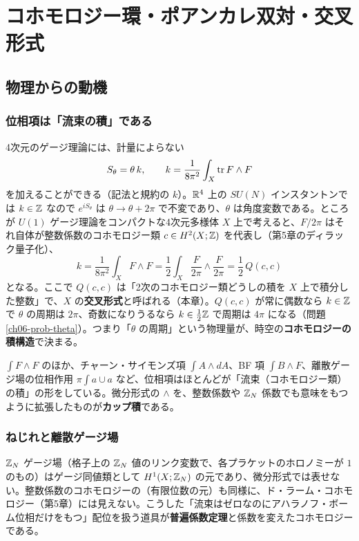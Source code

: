 \chapter{コホモロジー環・ポアンカレ双対・交叉形式}\label{ch:06}

\section{物理からの動機}

\subsection*{位相項は「流束の積」である}
4次元のゲージ理論には、計量によらない
\[
S_\theta=\theta\,k,\qquad k=\frac{1}{8\pi^2}\int_X\tr F\wedge F
\]
を加えることができる（記法と規約の $k$）。$\mathbb{R}^4$ 上の $SU(N)$ インスタントンでは $k\in\mathbb{Z}$ なので $e^{iS_\theta}$ は $\theta\to\theta+2\pi$ で不変であり、$\theta$ は角度変数である。ところが $U(1)$ ゲージ理論をコンパクトな4次元多様体 $X$ 上で考えると、$F/2\pi$ はそれ自体が整数係数のコホモロジー類 $c\in H^2(X;\mathbb{Z})$ を代表し（第5章のディラック量子化）、
\[
k=\frac{1}{8\pi^2}\int_X F\wedge F=\frac12\int_X\frac{F}{2\pi}\wedge\frac{F}{2\pi}=\frac12\,Q(c,c)
\]
となる。ここで $Q(c,c)$ は「2次のコホモロジー類どうしの積を $X$ 上で積分した整数」で、$X$ の\textbf{交叉形式}と呼ばれる（本章）。$Q(c,c)$ が常に偶数なら $k\in\mathbb{Z}$ で $\theta$ の周期は $2\pi$、奇数になりうるなら $k\in\tfrac12\mathbb{Z}$ で周期は $4\pi$ になる（問題 \ref{ch06-prob-theta}）。つまり「$\theta$ の周期」という物理量が、時空の\textbf{コホモロジーの積構造}で決まる。

$\int F\wedge F$ のほか、チャーン・サイモンズ項 $\int A\wedge dA$、BF 項 $\int B\wedge F$、離散ゲージ場の位相作用 $\pi\int a\cup a$ など、位相項はほとんどが「流束（コホモロジー類）の積」の形をしている。微分形式の $\wedge$ を、整数係数や $\mathbb{Z}_N$ 係数でも意味をもつように拡張したものが\textbf{カップ積}である。

\subsection*{ねじれと離散ゲージ場}
$\mathbb{Z}_N$ ゲージ場（格子上の $\mathbb{Z}_N$ 値のリンク変数で、各プラケットのホロノミーが $1$ のもの）はゲージ同値類として $H^1(X;\mathbb{Z}_N)$ の元であり、微分形式では表せない。整数係数のコホモロジーの（有限位数の元）も同様に、ド・ラーム・コホモロジー（第5章）には見えない。こうした「流束はゼロなのにアハラノフ・ボーム位相だけをもつ」配位を扱う道具が\textbf{普遍係数定理}と係数を変えたコホモロジーである。

